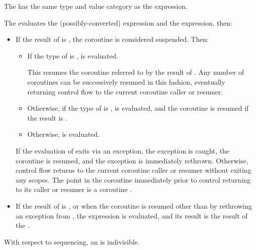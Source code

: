 \pnum
The  has the same type and value category
as the  expression.

\pnum
The  evaluates
the (possibly-converted)  expression and
the  expression, then:
\begin{itemize}
\item
If the result of  is ,
the coroutine is considered suspended.
Then:
\begin{itemize}
\item
If the type of 
is ,
 is evaluated.
\begin{note}
This resumes the coroutine referred to
by the result of .
Any number of coroutines can be successively resumed in this fashion,
eventually returning control flow to the current coroutine caller or
resumer.
\end{note}

\item
Otherwise, if the type of 
is ,
 is evaluated,
and the coroutine is resumed if the result is .

\item
Otherwise,  is evaluated.
\end{itemize}
If the evaluation of 
exits via an exception, the exception is caught,
the coroutine is resumed, and the exception is immediately
rethrown. Otherwise, control flow returns
to the current coroutine caller or resumer
without exiting any scopes.
%
The point in the coroutine
immediately prior to control returning to its caller or resumer
is a coroutine .

\item
If the result of  is ,
or when the coroutine is resumed
other than by rethrowing an exception from ,
the  expression is evaluated, and
its result is the result of the .
\end{itemize}
\begin{note}
With respect to sequencing,
an  is indivisible.
\end{note}

